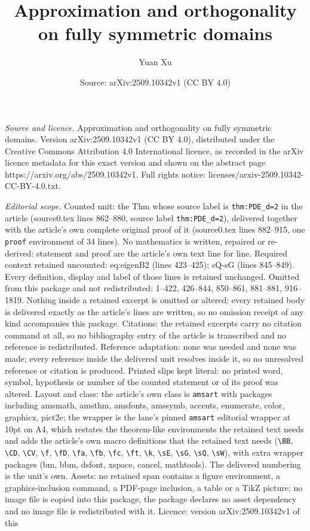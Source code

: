 \documentclass[10pt,a4paper]{amsart}
\title[Approximation and orthogonality on fully symmetric domains]{Approximation and orthogonality on fully symmetric domains}
\author{Yuan Xu}
\date{Source: arXiv:2509.10342v1 (CC BY 4.0)}
\begin{document}
\maketitle

\noindent\emph{Source and licence.} Approximation and orthogonality on fully symmetric domains. Version arXiv:2509.10342v1 (CC BY 4.0), distributed under the Creative Commons Attribution 4.0 International licence, as recorded in the arXiv licence metadata for this exact version and shown on the abstract page https://arxiv.org/abs/2509.10342v1. Full rights notice: licenses/arxiv-2509.10342-CC-BY-4.0.txt.\par\smallskip

\noindent\textit{Editorial scope.} Counted unit: the Thm whose source label is \texttt{thm:PDE\_d=2} in the article (source0.tex lines 862--880, source label \texttt{thm:PDE\_d=2}), delivered together with the article's own complete original proof of it (source0.tex lines 882--915, one \texttt{proof} environment of 34 lines). No mathematics is written, repaired or re-derived: statement and proof are the article's own text line for line. Required context retained uncounted: eq:eigenB2 (lines 423--425); sQ-sG (lines 845--849). Every definition, display and label of those lines is retained unchanged. Omitted from this package and not redistributed: 1--422, 426--844, 850--861, 881--881, 916--1819. Nothing inside a retained excerpt is omitted or altered: every retained body is delivered exactly as the article's lines are written, so no omission receipt of any kind accompanies this package. Citations: the retained excerpts carry no citation command at all, so no bibliography entry of the article is transcribed and no reference is redistributed. Reference adaptation: none was needed and none was made; every reference inside the delivered unit resolves inside it, so no unresolved reference or citation is produced. Printed slips kept literal: no printed word, symbol, hypothesis or number of the counted statement or of its proof was altered. Layout and class: the article's own class is \texttt{amsart} with packages including amsmath, amsthm, amsfonts, amssymb, accents, enumerate, color, graphicx, pict2e; the wrapper is the lane's pinned \texttt{amsart} editorial wrapper at 10pt on A4, which restates the theorem-like environments the retained text needs and adds the article's own macro definitions that the retained text needs (\texttt{\textbackslash BB}, \texttt{\textbackslash CD}, \texttt{\textbackslash CV}, \texttt{\textbackslash f}, \texttt{\textbackslash fD}, \texttt{\textbackslash fa}, \texttt{\textbackslash fb}, \texttt{\textbackslash fc}, \texttt{\textbackslash ft}, \texttt{\textbackslash k}, \texttt{\textbackslash sE}, \texttt{\textbackslash sG}, \texttt{\textbackslash sQ}, \texttt{\textbackslash sW}), with extra wrapper packages (bm, bbm, dsfont, xspace, cancel, mathtools). The delivered numbering is the unit's own. Assets: no retained span contains a figure environment, a graphics-inclusion command, a PDF-page inclusion, a table or a TikZ picture; no image file is copied into this package, the package declares no asset dependency and no image file is redistributed with it. Licence: version arXiv:2509.10342v1 of this 
\end{document}

